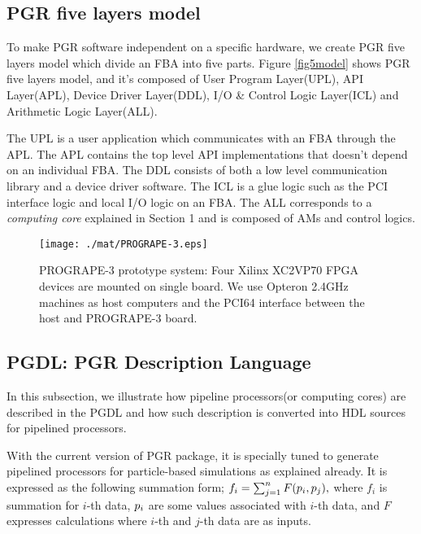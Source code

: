 \documentclass{llncs}
\begin{document}
\subsection{PGR five layers model}

To make PGR software independent on a specific hardware,
we create PGR five layers model which divide 
an FBA into five parts.
Figure \ref{fig5model} shows PGR five layers model, 
and it's composed of User Program Layer(UPL), API Layer(APL),
Device Driver Layer(DDL), I/O \& Control Logic Layer(ICL) and
Arithmetic Logic Layer(ALL).

The UPL is a user application which communicates with an FBA through the APL.
The APL contains the top level API implementations that
doesn't depend on an individual FBA.
The DDL consists of both a low level communication library and a device driver software. 
The ICL is a glue logic such as the PCI interface logic and 
local I/O logic on an FBA.
The ALL corresponds to a {\it computing core} explained in Section 1
and is composed of AMs and control logics.


\begin{figure}[htb]
\begin{center}
    \texttt{[image: ./mat/PROGRAPE-3.eps]}
    \caption{PROGRAPE-3 prototype system: Four Xilinx XC2VP70 FPGA devices are mounted on single board. We use Opteron 2.4GHz machines as host computers and the PCI64 interface between the host and PROGRAPE-3 board.}
    \label{photopg3}
\end{center}
\end{figure}

\subsection{PGDL: PGR Description Language}
\label{SecPGDL}
In this subsection, we illustrate how pipeline processors(or computing cores)
are described in the PGDL and how such description is converted 
into HDL sources for pipelined processors.

With the current version of PGR package, 
it is specially tuned to generate pipelined processors
for particle-based simulations as explained already.
It is expressed as the following summation form;
$f_i = \sum_{j = 1}^{n} F(\boldmath{p}_i, \boldmath{p}_j),$
where $f_i$ is summation for $i$-th data, $\boldmath{p}_i$ are
some values associated with $i$-th data, and
$F$ expresses calculations where $i$-th and $j$-th data are as inputs.
\end{document}
